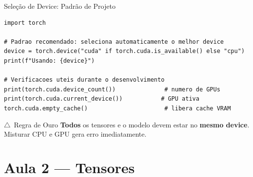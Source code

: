 \documentclass[aspectratio=169, 10pt]{beamer}
\newcommand{\faExclamationTriangle}{$\triangle$}
\begin{document}

\begin{frame}[fragile]{Seleção de Device: Padrão de Projeto}
\begin{lstlisting}
import torch

# Padrao recomendado: seleciona automaticamente o melhor device
device = torch.device("cuda" if torch.cuda.is_available() else "cpu")
print(f"Usando: {device}")

# Verificacoes uteis durante o desenvolvimento
print(torch.cuda.device_count())              # numero de GPUs
print(torch.cuda.current_device())           # GPU ativa
torch.cuda.empty_cache()                      # libera cache VRAM
\end{lstlisting}

\vspace{0.4em}
\begin{alertblock}{\faExclamationTriangle\ Regra de Ouro}
  \textbf{Todos} os tensores e o modelo devem estar no \textbf{mesmo device}.
  Misturar CPU e GPU gera erro imediatamente.
\end{alertblock}
\end{frame}

\section{Aula 2 — Tensores}
\end{document}

